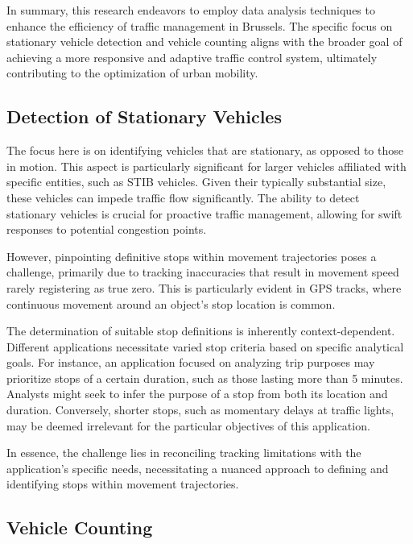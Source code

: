 \documentclass[12pt]{report}
\begin{document}
	In summary, this research endeavors to employ data analysis techniques to enhance the efficiency of traffic management in Brussels. The specific focus on stationary vehicle detection and vehicle counting aligns with the broader goal of achieving a more responsive and adaptive traffic control system, ultimately contributing to the optimization of urban mobility.
	
	\subsection{Detection of Stationary Vehicles}
	\label{sec:DetectionOfStationaryVehicles}
	
	The focus here is on identifying vehicles that are stationary, as opposed to those in motion. This aspect is particularly significant for larger vehicles affiliated with specific entities, such as STIB vehicles. Given their typically substantial size, these vehicles can impede traffic flow significantly. The ability to detect stationary vehicles is crucial for proactive traffic management, allowing for swift responses to potential congestion points.
	
	However, pinpointing definitive stops within movement trajectories poses a challenge, primarily due to tracking inaccuracies that result in movement speed rarely registering as true zero. This is particularly evident in GPS tracks, where continuous movement around an object's stop location is common.
	
	The determination of suitable stop definitions is inherently context-dependent. Different applications necessitate varied stop criteria based on specific analytical goals. For instance, an application focused on analyzing trip purposes may prioritize stops of a certain duration, such as those lasting more than 5 minutes. Analysts might seek to infer the purpose of a stop from both its location and duration. Conversely, shorter stops, such as momentary delays at traffic lights, may be deemed irrelevant for the particular objectives of this application.
	
	In essence, the challenge lies in reconciling tracking limitations with the application's specific needs, necessitating a nuanced approach to defining and identifying stops within movement trajectories.
	
	\subsection{Vehicle Counting}
	
\end{document}
